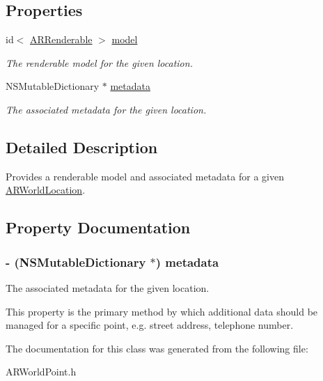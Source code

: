 \subsection*{Properties}
\begin{DoxyCompactItemize}
\item 
\hypertarget{interface_a_r_world_point_a31c4c5837e58a5d02fc59c370c9138b9}{
id$<$ \hyperlink{protocol_a_r_renderable-p}{ARRenderable} $>$ \hyperlink{interface_a_r_world_point_a31c4c5837e58a5d02fc59c370c9138b9}{model}}
\label{interface_a_r_world_point_a31c4c5837e58a5d02fc59c370c9138b9}

\begin{DoxyCompactList}\small\item\em The renderable model for the given location. \end{DoxyCompactList}\item 
NSMutableDictionary $\ast$ \hyperlink{interface_a_r_world_point_a25146859c4e3ab1a0bf9ba74e3fdb763}{metadata}
\begin{DoxyCompactList}\small\item\em The associated metadata for the given location. \end{DoxyCompactList}\end{DoxyCompactItemize}


\subsection{Detailed Description}
Provides a renderable model and associated metadata for a given \hyperlink{interface_a_r_world_location}{ARWorldLocation}. 

\subsection{Property Documentation}
\hypertarget{interface_a_r_world_point_a25146859c4e3ab1a0bf9ba74e3fdb763}{
\subsubsection[{metadata}]{\setlength{\rightskip}{0pt plus 5cm}-\/ (NSMutableDictionary $\ast$) metadata}}
\label{interface_a_r_world_point_a25146859c4e3ab1a0bf9ba74e3fdb763}


The associated metadata for the given location. 

This property is the primary method by which additional data should be managed for a specific point, e.g. street address, telephone number. 

The documentation for this class was generated from the following file:\begin{DoxyCompactItemize}
\item 
ARWorldPoint.h\end{DoxyCompactItemize}
